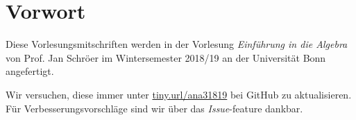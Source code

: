 \chapter*{Vorwort}
Diese Vorlesungsmitschriften werden in der Vorlesung \textit{Einführung in die Algebra} von Prof. Jan Schröer im Wintersemester 2018/19 an der Universität Bonn angefertigt.\par
Wir versuchen, diese immer unter \url{tiny.url/ana31819} bei GitHub zu aktualisieren. Für Verbesserungsvorschläge sind wir über das \textit{Issue}-feature dankbar.